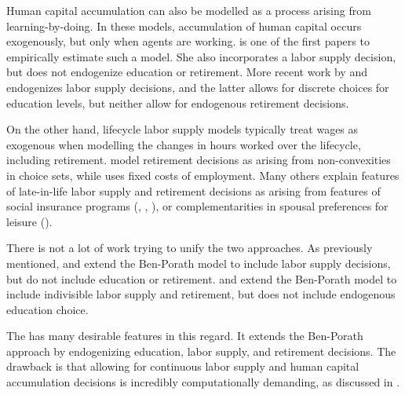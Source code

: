 \documentclass[12pt]{article}
\begin{document}
Human capital accumulation can also be modelled as a process arising from learning-by-doing. 
In these models, accumulation of human capital occurs exogenously, but only when agents are working.
\textcite{shaw_1989_lifecycle_labor_supply_human_capital} is one of the first papers to empirically estimate such a model.
She also incorporates a labor supply decision, but does not endogenize education or retirement.
More recent work by \textcite{imai_keane_2004_lifecycle_labor_supply_human_capital_accumulation} and \textcite{blundell_costa-dias_meghir_shaw_2016_female_lifecycle_labor_supply_education_human_capital_welfare} endogenizes labor supply decisions, and the latter allows for discrete choices for education levels, but neither allow for endogenous retirement decisions.

On the other hand, lifecycle labor supply models typically treat wages as exogenous when modelling the changes in hours worked over the lifecycle, including retirement.
\textcite{rosen_1976_lifecycle_human_capital} model retirement decisions as arising from non-convexities in choice sets, while \textcite{prescott_rogerson_wallenius_2009_lifetime_aggregate_labor_supply_workweek_length_fixed_costs} uses fixed costs of employment.
Many others explain features of late-in-life labor supply and retirement decisions as arising from features of social insurance programs (\textcite{rush_phelan_1997_labor_supply_incomplete_markets_social_security_medicare}, \textcite{french_2005_retirement_social_security}, \textcite{french_jones_2011_retirement_health_insurance_medicare_social_security}), or complementarities in spousal preferences for leisure (\textcite{casanova_2010_retirement_spouse}).

There is not a lot of work trying to unify the two approaches.
As previously mentioned, \textcite{heckman_1976_lifecycle_human_capital_labor_supply} and \textcite{heckman_1976_estimate_human_capital_production_function} extend the Ben-Porath model to include labor supply decisions, but do not include education or retirement.
\textcite{fan_seshadri_taber_2012_lifetime_labor_supply_human_capital} and \textcite{manuelli_seshadri_shin_2012_lifetime_labor_supply_human_capital} extend the Ben-Porath model to include indivisible labor supply and retirement, but does not include endogenous education choice.

The \textcite{blinder_weiss_1976_lifecycle_human_capital_labor_supply_synthesis} has many desirable features in this regard.
It extends the Ben-Porath approach by endogenizing education, labor supply, and retirement decisions.
The drawback is that allowing for continuous labor supply and human capital accumulation decisions is incredibly computationally demanding, as discussed in \textcite{imai_keane_2004_lifecycle_labor_supply_human_capital_accumulation}.
\end{document}
